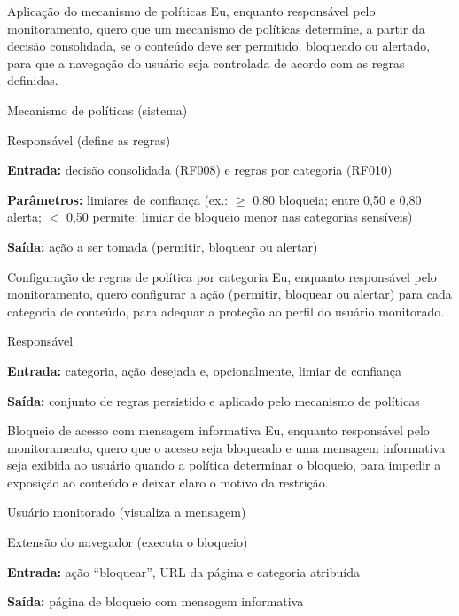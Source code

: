 \documentclass[
    12pt,           %
    oneside,        %
    a4paper,        %
    chapter=TITLE,  %
    english,        %
    brazil          %
]{abntex2}
\begin{document}
{Aplicação do mecanismo de políticas}
{Eu, enquanto responsável pelo monitoramento, quero que um mecanismo de políticas determine, a partir da decisão consolidada, se o conteúdo deve ser permitido, bloqueado ou alertado, para que a navegação do usuário seja controlada de acordo com as regras definidas.}
{\begin{dadoslista}
\item Mecanismo de políticas (sistema)
\item Responsável (define as regras)
\end{dadoslista}}
{\begin{dadoslista}
\item \textbf{Entrada:} decisão consolidada (RF008) e regras por categoria (RF010)
\item \textbf{Parâmetros:} limiares de confiança (ex.: $\geq$ 0,80 bloqueia; entre 0,50 e 0,80 alerta; $<$ 0,50 permite; limiar de bloqueio menor nas categorias sensíveis)
\item \textbf{Saída:} ação a ser tomada (permitir, bloquear ou alertar)
\end{dadoslista}}

{Configuração de regras de política por categoria}
{Eu, enquanto responsável pelo monitoramento, quero configurar a ação (permitir, bloquear ou alertar) para cada categoria de conteúdo, para adequar a proteção ao perfil do usuário monitorado.}
{\begin{dadoslista}
\item Responsável
\end{dadoslista}}
{\begin{dadoslista}
\item \textbf{Entrada:} categoria, ação desejada e, opcionalmente, limiar de confiança
\item \textbf{Saída:} conjunto de regras persistido e aplicado pelo mecanismo de políticas
\end{dadoslista}}

{Bloqueio de acesso com mensagem informativa}
{Eu, enquanto responsável pelo monitoramento, quero que o acesso seja bloqueado e uma mensagem informativa seja exibida ao usuário quando a política determinar o bloqueio, para impedir a exposição ao conteúdo e deixar claro o motivo da restrição.}
{\begin{dadoslista}
\item Usuário monitorado (visualiza a mensagem)
\item Extensão do navegador (executa o bloqueio)
\end{dadoslista}}
{\begin{dadoslista}
\item \textbf{Entrada:} ação ``bloquear'', URL da página e categoria atribuída
\item \textbf{Saída:} página de bloqueio com mensagem informativa
\end{dadoslista}}
\end{document}
